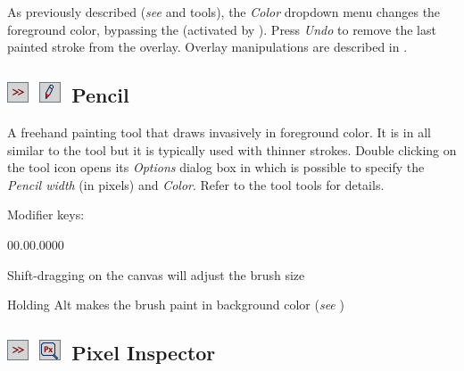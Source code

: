 As previously described (\emph{see}  and 
tools), the \emph{Color} dropdown menu changes the foreground color,
bypassing the  (activated by 
). Press \emph{Undo} to remove the last painted stroke
from the overlay. Overlay manipulations are described in .




\subsection[Pencil]{\noindent \textsf{\protect\includegraphics[bb=0bp 5bp 20bp 20bp,scale=0.6]{images/tools/Switcher}}~\textsf{\protect\includegraphics[bb=0bp 5bp 20bp 20bp,scale=0.6]{images/tools/Pencil}}~Pencil\label{sub:Pencil}\feature{}}

A freehand painting tool that draws invasively in foreground color.
It is in all similar to the  tool but it is typically
used with thinner strokes. Double clicking on the tool icon opens
its \emph{Options} dialog box in which is possible to specify the
\emph{Pencil width} (in pixels) and \emph{Color}. Refer to the 
tool tools for details.

Modifier keys:
\begin{lyxlist}{00.00.0000}
\item [{\mykeystroke{Shift}}] \noindent Shift-dragging on the canvas will
adjust the brush size
\item [{\mykeystroke{Alt}}] \noindent Holding Alt makes the brush paint
in background color (\emph{see} )
\end{lyxlist}



\subsection[Pixel Inspector]{\noindent \textsf{\protect\includegraphics[bb=0bp 5bp 20bp 20bp,scale=0.6]{images/tools/Switcher}}~\textsf{\protect\includegraphics[bb=0bp 5bp 20bp 20bp,scale=0.6]{images/tools/Inspector}}~Pixel
Inspector\textmd{}\label{sub:PixelInspector}\feature{}}

